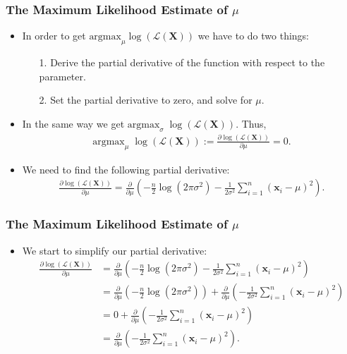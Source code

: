 \begin{frame}
  \frametitle{The Maximum Likelihood Estimate of $\mu$}
  \begin{itemize}
  \item In order to get $\text{argmax}_\mu \log\left(\mathcal{L}(\mathbf{X})\right)$ we have to do two things:
    \begin{itemize}
    \item[1.] Derive the partial derivative of the function with respect to the parameter.
    \item[2.] Set the partial derivative to zero, and solve for $\mu$.
    \end{itemize}
  \item In the same way we get $\text{argmax}_\sigma \; \log\left(\mathcal{L}(\mathbf{X})\right)$. Thus,
    \begin{align}
      \text{argmax}_\mu \; \log\left(\mathcal{L}(\mathbf{X})\right) := \frac{\partial \log\left(\mathcal{L}(\mathbf{X})\right)}{\partial \mu} = 0.
    \end{align}
  \item We need to find the following partial derivative:
    \begin{align}
      \frac{\partial \log\left(\mathcal{L}(\mathbf{X})\right)}{\partial \mu} = \frac{\partial}{\partial\mu} \left( - \frac{n}{2} \log\left(2\pi\sigma^2\right) -\frac{1}{2\sigma^2} \sum_{i=1}^{n} (\mathbf{x}_i-\mu)^2 \right).
    \end{align}
  \end{itemize}
\end{frame}


\begin{frame}
  \frametitle{The Maximum Likelihood Estimate of $\mu$}
  \begin{itemize}
  \item We start to simplify our partial derivative:
    \begin{align}
      \frac{\partial \log\left(\mathcal{L}(\mathbf{X})\right)}{\partial \mu} &= \frac{\partial}{\partial\mu} \left( - \frac{n}{2} \log\left(2\pi\sigma^2\right) -\frac{1}{2\sigma^2} \sum_{i=1}^{n} (\mathbf{x}_i-\mu)^2 \right)\\
                                                                             &= \frac{\partial}{\partial\mu} \left( - \frac{n}{2} \log\left(2\pi\sigma^2\right)\right) + \frac{\partial}{\partial\mu}\left(-\frac{1}{2\sigma^2} \sum_{i=1}^{n} (\mathbf{x}_i-\mu)^2 \right)\\
                                                                             &= 0 + \frac{\partial}{\partial\mu}\left(-\frac{1}{2\sigma^2} \sum_{i=1}^{n} (\mathbf{x}_i-\mu)^2 \right)\\
                                                                             &= \frac{\partial}{\partial\mu}\left(-\frac{1}{2\sigma^2} \sum_{i=1}^{n} (\mathbf{x}_i-\mu)^2 \right).
    \end{align}
  \end{itemize}
\end{frame}



